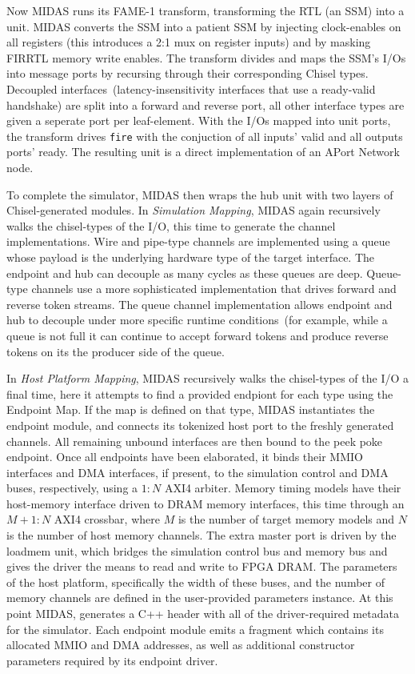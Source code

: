     Now MIDAS runs its FAME-1 transform, transforming the RTL (an SSM) into a
    unit.  MIDAS converts the SSM into a patient SSM by injecting clock-enables
    on all registers (this introduces a 2:1 mux on register inputs) and by
    masking FIRRTL memory write enables. The transform divides and maps the
    SSM's I/Os into message ports by recursing through their corresponding Chisel types.
    Decoupled interfaces~(latency-insensitivity interfaces that use a ready-valid
    handshake) are split into a forward and reverse port, all other
    interface types are given a seperate port per leaf-element.  With the I/Os
    mapped into unit ports, the transform drives \texttt{fire} with the
    conjuction of all inputs' valid and all outputs ports' ready. The resulting
    unit is a direct implementation of an APort Network node.

    To complete the simulator, MIDAS then wraps the hub unit with two layers of Chisel-generated modules.
    In \emph{Simulation Mapping}, MIDAS again recursively walks the chisel-types of the I/O, this time
    to generate the channel implementations.
    Wire and pipe-type channels are implemented using a queue whose
    payload is the underlying hardware type of the target interface. The endpoint and hub can decouple
    as many cycles as these queues are deep.  Queue-type channels use a more sophisticated implementation
    that drives forward and reverse token streams. The queue channel
    implementation allows endpoint and hub to decouple under more specific runtime conditions~(for example,
    while a queue is not full it can continue to accept forward tokens and produce reverse tokens on its the producer side
    of the queue.

    In \emph{Host Platform Mapping}, MIDAS recursively walks the chisel-types
    of the I/O a final time, here it attempts to find a provided endpiont for
    each type using the Endpoint Map. If the map is defined on that type, MIDAS
    instantiates the endpoint module, and connects its tokenized host port to the freshly
    generated channels. All remaining unbound interfaces are then bound to the
    peek poke endpoint. Once all endpoints have been elaborated, it binds their
    MMIO interfaces and DMA interfaces, if present, to the simulation control
    and DMA buses, respectively, using a $1:N$ AXI4 arbiter. Memory timing
    models have their host-memory interface driven to DRAM memory interfaces,
    this time through an $M+1:N$ AXI4 crossbar, where $M$ is the number of
    target memory models and $N$ is the number of host memory channels. The
    extra master port is driven by the loadmem unit, which bridges the
    simulation control bus and memory bus and gives the driver the means to
    read and write to FPGA DRAM. The parameters of the host platform,
    specifically the width of these buses, and the number of memory channels
    are defined in the user-provided parameters instance. At this point MIDAS,
    generates a C++ header with all of the driver-required metadata for the
    simulator. Each endpoint module emits a fragment which contains its allocated MMIO and
    DMA addresses, as well as additional constructor parameters required by its
    endpoint driver.

